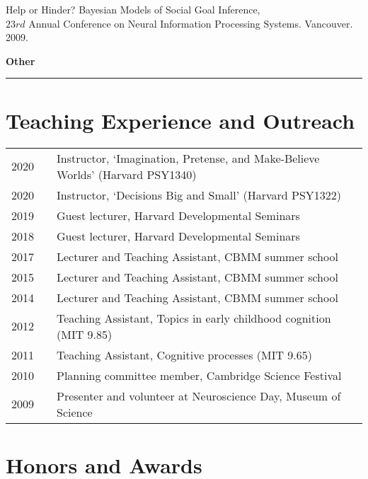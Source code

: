 \documentclass[margin,line,pifont,palatino,courier]{res}
\begin{document}
\begin{resume}
Help or Hinder? Bayesian Models of Social Goal Inference,\\ $23rd$ Annual Conference on Neural Information Processing Systems. Vancouver. 2009.

\begin{adjustwidth*}{-17.8cm}{-2cm}

\hspace{-3.8em}\textbf{Other}\\
\hspace*{-3.8em}\noindent\rule{8cm}{0.4pt}

\end{adjustwidth*}

\section{\sc Teaching Experience and Outreach}

\begin{tabular}{@{}p{0.4in}p{0.3in}p{4in}}

2020 & & Instructor, `Imagination, Pretense, and Make-Believe Worlds' (Harvard PSY1340) \\
2020 & & Instructor, `Decisions Big and Small' (Harvard PSY1322) \\
2019 & & Guest lecturer, Harvard Developmental Seminars\\
2018 & & Guest lecturer, Harvard Developmental Seminars\\
2017 & & Lecturer and Teaching Assistant, CBMM summer school\\
2015 & & Lecturer and Teaching Assistant, CBMM summer school\\
2014 & & Lecturer and Teaching Assistant, CBMM summer school\\
2012 & & Teaching Assistant, Topics in early childhood cognition (MIT 9.85)\\
2011 & & Teaching Assistant, Cognitive processes (MIT 9.65)\\
2010 & & Planning committee member, Cambridge Science Festival\\
2009 & & Presenter and volunteer at Neuroscience Day, Museum of Science
\end{tabular}


\section{\sc Honors and Awards}


\end{resume}
\end{document}
